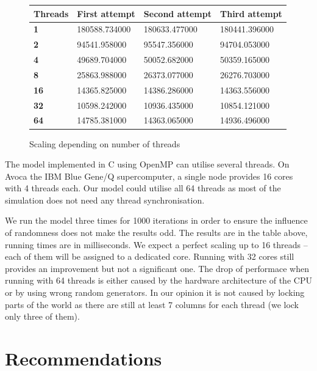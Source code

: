 \documentclass[a4paper]{article}
\begin{document}
\begin{figure}[ht]
    \centering
    \begin{tabu} {| X[0.8,c,p] || X[1,c,p] | X[1,c,p] | X[1,c,p] |}
        \rowfont{\bfseries}
        \hline
        Threads &
        First attempt &
        Second attempt&
        Third attempt \\
        \hline
        \hline
        \textbf{1} & 180588.734000 & 180633.477000 & 180441.396000 \\
        \hline
        \textbf{2} & 94541.958000 & 95547.356000 & 94704.053000 \\
        \hline
        \textbf{4} & 49689.704000 & 50052.682000 & 50359.165000 \\
        \hline
        \textbf{8} & 25863.988000 & 26373.077000 & 26276.703000 \\
        \hline
        \textbf{16} & 14365.825000 & 14386.286000 & 14363.556000 \\
        \hline
        \textbf{32} & 10598.242000 & 10936.435000 & 10854.121000 \\
        \hline
        \textbf{64} & 14785.381000 & 14363.065000 & 14936.496000 \\
        \hline
    \end{tabu}
    \caption{Scaling depending on number of threads}
\end{figure}


The model implemented in C using OpenMP can utilise several threads.
On Avoca the IBM Blue Gene/Q supercomputer, a single node provides 16 cores with 4 threads each.
Our model could utilise all 64 threads as most of the simulation does not need any thread synchronisation.

We run the model three times for 1000 iterations in order to ensure the influence of randomness does not make the results odd.
The results are in the table above, running times are in milliseconds.
We expect a perfect scaling up to 16 threads -- each of them will be assigned to a dedicated core.
Running with 32 cores still provides an improvement but not a significant one.
The drop of performace when running with 64 threads is either caused by the hardware architecture of the CPU or by using wrong random generators.
In our opinion it is not caused by locking parts of the world as there are still at least 7 columns for each thread (we lock only three of them).

\section{Recommendations}




\end{document}
